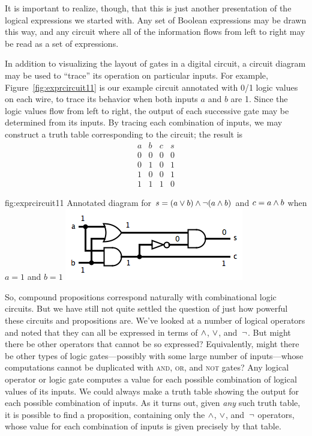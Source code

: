 It is important to realize, though, that this is just another presentation of the logical expressions we started with. Any set of Boolean expressions may be drawn this way, and any circuit where all of the information flows from left to right may be read as a set of expressions.

In addition to visualizing the layout of gates in a digital circuit, a circuit diagram may be used to ``trace'' its operation on particular inputs. For example, Figure~\ref{fig:exprcircuit11} is our example circuit annotated with 0/1 logic values on each wire, to trace its behavior when both inputs $a$ and $b$ are 1. Since the logic values flow from left to right, the output of each successive gate may be determined from its inputs. By tracing each combination of inputs, we may construct a truth table corresponding to the circuit; the result is
\[ \begin{array}{cc|cc}
a  & b  & c & s\\ \hline
0 & 0 & 0 & 0\\
0 & 1 & 0 & 1\\
1 & 0 & 0 & 1\\
1 & 1 & 1 & 0
\end{array} \]

\fig
	{fig:exprcircuit11}
	{Annotated diagram for $s=(a\vee b)\wedge\lnot(a\wedge b)$ and $c=a\wedge b$ when $a=1$ and $b=1$}
	{\includegraphics[width=!,height=!,scale=0.75]{graphics/HalfAdder11.png}}

\medbreak
   
So, compound propositions correspond naturally with combinational
logic circuits.  But we have still not quite settled the question
of just how powerful these circuits and propositions are.
We've looked at a number of logical operators and noted that they
can all be expressed in terms of $\wedge$, $\vee$, and~$\lnot$.
But might there be other operators that cannot be so expressed?
Equivalently, might there be other types of logic gates---possibly
with some large number of inputs---whose
computations cannot be duplicated with \textsc{and}, \textsc{or}, and
\textsc{not} gates?   Any logical operator or logic gate computes
a value for each possible combination of logical values of its inputs.
We could always make a truth table showing the output for each 
possible combination of inputs.  As it turns out, given \emph{any} such
truth table, it is possible to find a proposition, containing only
the $\wedge$, $\vee$, and~$\lnot$ operators, whose value for each combination
of inputs is given precisely by that table.    


